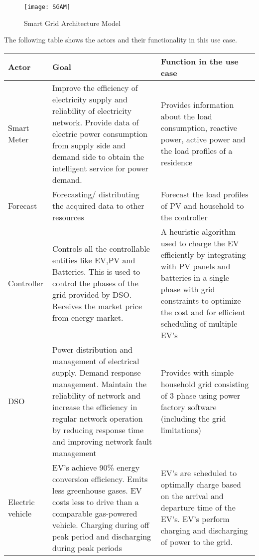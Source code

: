 \begin{figure}[h!b]
	\centering
	\texttt{[image: SGAM]}
	\caption{Smart Grid Architecture Model }
	\label{fig:Smart Grid Architecture Model }
\end{figure}

The following table shows the actors and their functionality in this use case. 
 \begin{table}[h!b]
	\centering
	\begin{tabular} { | p{3cm} | p{7cm} | p{7cm} | }
    \hline
		\textbf{Actor} & \textbf{Goal} & \textbf{Function in the use case} \\ 
		\hline
		Smart Meter & Improve the efficiency of electricity supply and reliability of electricity network. Provide data of electric power consumption from supply side and demand side to obtain the intelligent service for power demand. & Provides information about the load consumption, reactive power, active power and the load profiles of a residence \\ 
		\hline
		 Forecast & Forecasting/ distributing the acquired data to other resources &  Forecast the load profiles of PV and household to the controller \\ 
        \hline
         Controller & Controls all the controllable entities like EV,PV and Batteries. This is used to control the phases of the grid provided by DSO. Receives the market price from energy market. & A heuristic algorithm used to charge the EV efficiently by integrating with PV panels and batteries in a single phase with grid constraints to optimize the cost and for efficient scheduling of multiple EV's \\ 
		\hline
         DSO & Power distribution and management of electrical supply. Demand response management. Maintain the reliability of network and increase the efficiency in regular network operation by reducing response time and improving network fault management   &  Provides with simple household grid consisting of 3 phase using power factory software (including the grid limitations)  \\ 
		\hline
         Electric vehicle & EV's achieve 90\% energy conversion efficiency. Emits less greenhouse gases. EV costs less to drive than a comparable gas-powered vehicle. Charging during off peak period and discharging during peak periods & EV's are scheduled to optimally charge based on the arrival and departure time of the EV's. EV's perform charging and discharging of power to the grid. \\

\end{tabular}
\end{table}
